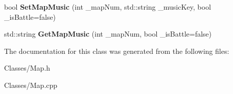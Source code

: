 \begin{DoxyCompactItemize}
\item 
bool {\bfseries Set\+Map\+Music} (int \+\_\+map\+Num, std\+::string \+\_\+music\+Key, bool \+\_\+is\+Battle=false)\hypertarget{class_c_map_aaa9849b77dc02cee31077c9c8b5a95f6}{}\label{class_c_map_aaa9849b77dc02cee31077c9c8b5a95f6}

\item 
std\+::string {\bfseries Get\+Map\+Music} (int \+\_\+map\+Num, bool \+\_\+is\+Battle=false)\hypertarget{class_c_map_ac0010b80157b3bcc5e4b71949208e5a3}{}\label{class_c_map_ac0010b80157b3bcc5e4b71949208e5a3}

\end{DoxyCompactItemize}


The documentation for this class was generated from the following files\+:\begin{DoxyCompactItemize}
\item 
Classes/Map.\+h\item 
Classes/Map.\+cpp\end{DoxyCompactItemize}
